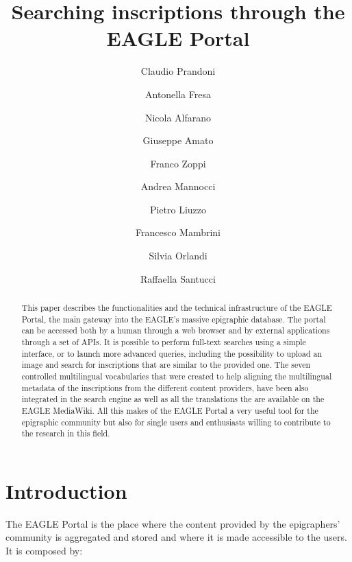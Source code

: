 \documentclass[amsthm,ebook]{saparticle}
\title{Searching inscriptions through the EAGLE Portal}
\author[PROMOTER]{Claudio Prandoni\corref{first}}
\author[PROMOTER]{Antonella Fresa}
\author[Gogate]{Nicola Alfarano}
\author[ISTI]{Giuseppe Amato}
\author[ISTI]{Franco Zoppi}
\author[ISTI]{Andrea Mannocci}
\author[HEI]{Pietro Liuzzo}
\author[DAI]{Francesco Mambrini}
\author[ROME]{Silvia Orlandi}
\author[ROME]{Raffaella Santucci}
\begin{document}
\maketitle

\begin{abstract}
This paper describes the functionalities and the technical infrastructure of the EAGLE Portal, the main
gateway into the EAGLE’s massive epigraphic database. The portal can be accessed both by a human through a web browser
and by external applications through a set of APIs. It is possible to perform full-text searches using a simple
interface, or to launch more advanced queries, including the possibility to upload an image and search for inscriptions
that are similar to the provided one. The seven controlled multilingual vocabularies that were created to help aligning
the multilingual metadata of the inscriptions from the different content providers, have been also integrated in the
search engine as well as all the translations the are available on the EAGLE MediaWiki. All this makes of the EAGLE
Portal a very useful tool for the epigraphic community but also for single users and enthusiasts willing to contribute
to the research in this field.
\end{abstract}


\section{Introduction}

\noindent The EAGLE Portal is the place where the content provided by the epigraphers' community is aggregated and stored and
where it is made accessible to the users. It is composed by:
\end{document}
